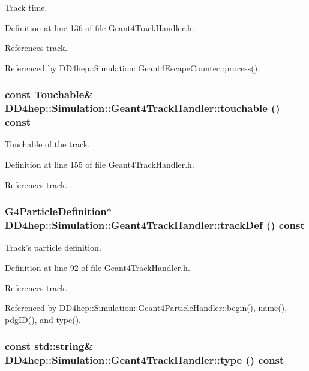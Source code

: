 Track time. 

Definition at line 136 of file Geant4TrackHandler.h.

References track.

Referenced by DD4hep::Simulation::Geant4EscapeCounter::process().\hypertarget{class_d_d4hep_1_1_simulation_1_1_geant4_track_handler_a5ed6c27f8de4cbfe76f4213c06bd72b3}{
\subsubsection[{touchable}]{\setlength{\rightskip}{0pt plus 5cm}const {\bf Touchable}\& DD4hep::Simulation::Geant4TrackHandler::touchable () const}}
\label{class_d_d4hep_1_1_simulation_1_1_geant4_track_handler_a5ed6c27f8de4cbfe76f4213c06bd72b3}


Touchable of the track. 

Definition at line 155 of file Geant4TrackHandler.h.

References track.\hypertarget{class_d_d4hep_1_1_simulation_1_1_geant4_track_handler_a3b1eb4da3634e8d0e912837732c00bdd}{
\subsubsection[{trackDef}]{\setlength{\rightskip}{0pt plus 5cm}G4ParticleDefinition$\ast$ DD4hep::Simulation::Geant4TrackHandler::trackDef () const}}
\label{class_d_d4hep_1_1_simulation_1_1_geant4_track_handler_a3b1eb4da3634e8d0e912837732c00bdd}


Track's particle definition. 

Definition at line 92 of file Geant4TrackHandler.h.

References track.

Referenced by DD4hep::Simulation::Geant4ParticleHandler::begin(), name(), pdgID(), and type().\hypertarget{class_d_d4hep_1_1_simulation_1_1_geant4_track_handler_a9083ce32805aafb9f95d1bdf53cfc440}{
\subsubsection[{type}]{\setlength{\rightskip}{0pt plus 5cm}const std::string\& DD4hep::Simulation::Geant4TrackHandler::type () const}}
\label{class_d_d4hep_1_1_simulation_1_1_geant4_track_handler_a9083ce32805aafb9f95d1bdf53cfc440}


